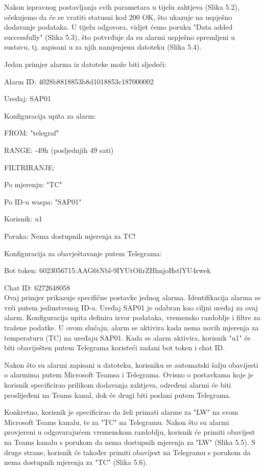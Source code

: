 \documentclass[times, utf8, zavrsni]{fer}
\begin{document}
Nakon ispravnog postavljanja svih parametara u tijelu zahtjeva (Slika 5.2), očekujemo da će se vratiti statusni kod 200 OK, što ukazuje na uspješno dodavanje podataka. U tijelu odgovora, vidjet ćemo poruku "Data added successfully" (Slika 5.3), što potvrđuje da su alarmi uspješno spremljeni u sustavu, tj. zapisani u za njih namjenjenu datoteku (Slika 5.4). 


Jedan primjer alarma iz datoteke može biti sljedeći:

Alarm ID: 4028b8818853b8d1018853c187000002

Uređaj: SAP01

Konfiguracija upita za alarm:

FROM: "telegraf"

RANGE: -49h (posljednjih 49 sati)

FILTRIRANJE:

Po mjerenju: "TC"

Po ID-u waspa: "SAP01"

Korisnik: u1

Poruka: Nema dostupnih mjerenja za TC!

Konfiguracija za obavještavanje putem Telegrama:

Bot token: 6023056715:AAG6tNbl-9IYUtOfirZHhnjoHstlYU4rwek

Chat ID: 6272648058
\\
Ovaj primjer prikazuje specifične postavke jednog alarma. Identifikacija alarma se vrši putem jedinstvenog ID-a. Uređaj SAP01 je odabran kao ciljni uređaj za ovaj alarm. Konfiguracija upita definira izvor podataka, vremensko razdoblje i filtre za tražene podatke. U ovom slučaju, alarm se aktivira kada nema novih mjerenja za temperaturu (TC) na uređaju SAP01. Kada se alarm aktivira, korisnik "u1" će biti obaviješten putem Telegrama koristeći zadani bot token i chat ID.

Nakon što su alarmi zapisani u datoteku, korisniku se automatski šalju obavijesti o alarmima putem Microsoft Teamsa i Telegrama. Ovisno o postavkama koje je korisnik specificirao prilikom dodavanja zahtjeva, određeni alarmi će biti proslijeđeni na Teams kanal, dok će drugi biti poslani putem Telegrama.

Konkretno, korisnik je specificirao da želi primati alarme za "LW" na svom Microsoft Teams kanalu, te za "TC" na Telegramu. Nakon što su alarmi provjereni u odgovarajućem vremenskom razdoblju, korisnik će primiti obavijest na Teams kanalu s porukom da nema dostupnih mjerenja za "LW" (Slika 5.5). S druge strane, korisnik će također primiti obavijest na Telegramu s porukom da nema dostupnih mjerenja za "TC" (Slika 5.6). 
\end{document}
